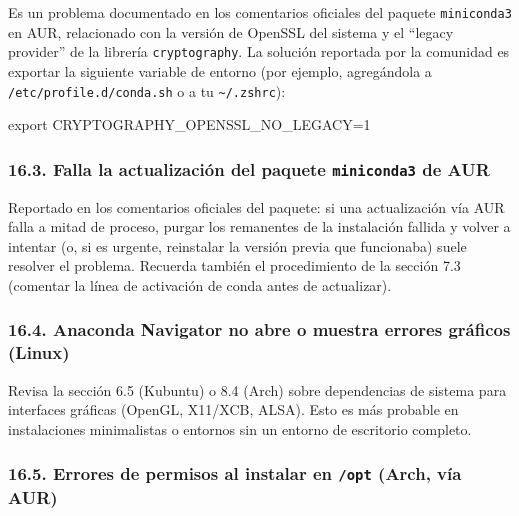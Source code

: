 \documentclass[
  doc,
  floatsintext,
  longtable,
  a4paper,
  nolmodern,
  notxfonts,
  notimes,
  12pt,
  colorlinks=true,linkcolor=blue,citecolor=blue,urlcolor=blue]{apa7}
\newenvironment{Shaded}{\begin{snugshade}}{\end{snugshade}}
\newcommand{\BuiltInTok}[1]{\textcolor[rgb]{0.00,0.23,0.31}{#1}}
\newcommand{\OperatorTok}[1]{\textcolor[rgb]{0.37,0.37,0.37}{#1}}
\newcommand{\StringTok}[1]{\textcolor[rgb]{0.13,0.47,0.30}{#1}}
\newcommand{\VariableTok}[1]{\textcolor[rgb]{0.07,0.07,0.07}{#1}}
\begin{document}
Es un problema documentado en los comentarios oficiales del paquete
\texttt{miniconda3} en AUR, relacionado con la versión de OpenSSL del
sistema y el ``legacy provider'' de la librería \texttt{cryptography}.
La solución reportada por la comunidad es exportar la siguiente variable
de entorno (por ejemplo, agregándola a \texttt{/etc/profile.d/conda.sh}
o a tu \texttt{\textasciitilde{}/.zshrc}):

\begin{Shaded}
\begin{Highlighting}[]
\BuiltInTok{export} \VariableTok{CRYPTOGRAPHY\_OPENSSL\_NO\_LEGACY}\OperatorTok{=}\StringTok{\textquotesingle{}1\textquotesingle{}}
\end{Highlighting}
\end{Shaded}

\subsubsection{\texorpdfstring{16.3. Falla la actualización del paquete
\texttt{miniconda3} de
AUR}{16.3. Falla la actualización del paquete miniconda3 de AUR}}\label{falla-la-actualizaciuxf3n-del-paquete-miniconda3-de-aur}

Reportado en los comentarios oficiales del paquete: si una actualización
vía AUR falla a mitad de proceso, purgar los remanentes de la
instalación fallida y volver a intentar (o, si es urgente, reinstalar la
versión previa que funcionaba) suele resolver el problema. Recuerda
también el procedimiento de la sección 7.3 (comentar la línea de
activación de conda antes de actualizar).

\subsubsection{16.4. Anaconda Navigator no abre o muestra errores
gráficos
(Linux)}\label{anaconda-navigator-no-abre-o-muestra-errores-gruxe1ficos-linux}

Revisa la sección 6.5 (Kubuntu) o 8.4 (Arch) sobre dependencias de
sistema para interfaces gráficas (OpenGL, X11/XCB, ALSA). Esto es más
probable en instalaciones minimalistas o entornos sin un entorno de
escritorio completo.

\subsubsection{\texorpdfstring{16.5. Errores de permisos al instalar en
\texttt{/opt} (Arch, vía
AUR)}{16.5. Errores de permisos al instalar en /opt (Arch, vía AUR)}}\label{errores-de-permisos-al-instalar-en-opt-arch-vuxeda-aur}
\end{document}
